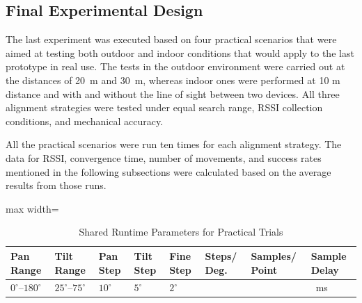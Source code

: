 \subsection{Final Experimental Design}

The last experiment was executed based on four practical scenarios that were aimed at testing both outdoor and indoor conditions that would apply to the last prototype in real use. The tests in the outdoor environment were carried out at the distances of 20~m and 30~m,  whereas indoor ones were performed at 10 m distance and with and without the line of sight between two devices. All three alignment strategies were tested under equal search range, RSSI collection conditions, and mechanical accuracy.

All the practical scenarios were run ten times for each alignment strategy. The data for RSSI, convergence time, number of movements, and success rates mentioned in the following subsections were calculated based on the average results from those runs.

\setlength{\tabcolsep}{4pt}

\vspace{0.5cm}
\begin{table}[H]
\centering
\caption{Shared Runtime Parameters for Practical Trials}
\label{tab:practical_runtime_results}
\renewcommand{\arraystretch}{1.25}
\begin{adjustbox}{max width=\textwidth}
\begin{tabular}{|
>{\raggedright\arraybackslash}p{1.7cm}|
>{\raggedright\arraybackslash}p{1.7cm}|
>{\raggedright\arraybackslash}p{1.4cm}|
>{\raggedright\arraybackslash}p{1.4cm}|
>{\raggedright\arraybackslash}p{1.4cm}|
>{\raggedright\arraybackslash}p{1.8cm}|
>{\raggedright\arraybackslash}p{2.0cm}|
>{\raggedright\arraybackslash}p{1.8cm}|}
\hline
\textbf{Pan Range} & \textbf{Tilt Range} & \textbf{Pan Step} & \textbf{Tilt Step} & \textbf{Fine Step} & \textbf{Steps/ Deg.} & \textbf{Samples/ Point} & \textbf{Sample Delay} \\
\hline
$0^\circ$--$180^\circ$ & $25^\circ$--$75^\circ$ & $10^\circ$ & $5^\circ$ & $2^\circ$ & 5 & 20 & 10~ms \\
\hline
\end{tabular}
\end{adjustbox}
\end{table}

